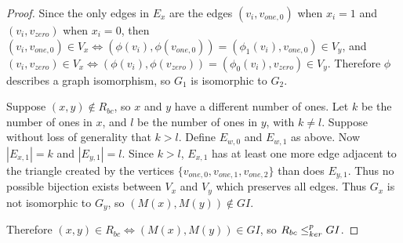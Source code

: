 \begin{proof}
  Since the only edges in $E_x$ are the edges $(v_i, v_{one,0})$ when $x_i=1$
  and $(v_i, v_{zero})$ when $x_i=0$, then $(v_i, v_{one,0})\in V_x
  \iff (\phi(v_i), \phi(v_{one,0}))=(\phi_1(v_i), v_{one,0})\in
  V_y$, and $(v_i, v_{zero})\in V_x \iff (\phi(v_i), \phi(v_{zero}))
  = (\phi_0(v_i), v_{zero})\in V_y$. Therefore $\phi$ describes a graph
  isomorphism, so $G_1$ is isomorphic to $G_2$.
  
  Suppose $(x, y)\notin R_{bc}$, so $x$ and $y$ have a different number of
  ones. Let $k$ be the number of ones in $x$, and $l$ be the number of ones in
  $y$, with $k\neq l$. Suppose without loss of generality that $k>l$. Define
  $E_{w,0}$ and $E_{w,1}$ as above. Now $|E_{x,1}|=k$ and $|E_{y,1}|=l$. Since
  $k>l$, $E_{x,1}$ has at least one more edge adjacent to the triangle created
  by the vertices $\{v_{one,0},v_{one,1},v_{one,2}\}$ than does $E_{y,1}$. Thus
  no possible bijection exists between $V_x$ and $V_y$ which preserves all
  edges. Thus $G_x$ is not isomorphic to $G_y$, so $(M(x), M(y))\notin GI$.

  Therefore $(x, y)\in R_{bc} \iff (M(x), M(y))\in GI$, so $R_{bc}\leq^{p}_{ker} GI$.
\end{proof}

